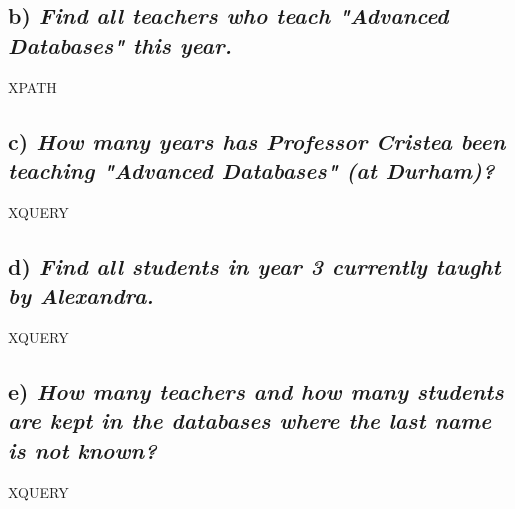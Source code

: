 \documentclass[11pt]{article} %
\begin{document}
\subsection*{b) \textit{Find all teachers who teach "Advanced Databases" this year.}}

XPATH

\subsection*{c) \textit{How many years has Professor Cristea been teaching "Advanced Databases" (at Durham)?}}

XQUERY

\subsection*{d) \textit{Find all students in year 3 currently taught by Alexandra.}}

XQUERY

\subsection*{e) \textit{How many teachers and how many students are kept in the databases where the last name is not known?}}

XQUERY
\end{document}
